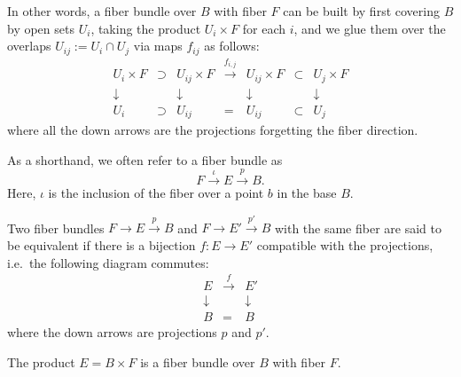 \documentclass[12pt]{article}
\numberwithin{equation}{section}
\begin{document}
In other words, a fiber bundle over $B$ with fiber $F$
can be built by first covering $B$ by open sets $U_i$,
taking the product $U_i \times F$ for each $i$,
and we glue them over the overlaps $U_{ij}:=U_i\cap U_j$ via
maps $f_{ij}$ as follows:
\begin{equation}
  \begin{array}{cccccccc}
    U_i \times F &\supset& U_{ij}\times F & \xrightarrow{f_{i,j}} & 
    U_{ij}\times F & \subset & U_j\times F \\
    \downarrow & & \downarrow & & \downarrow & & \downarrow \\
    U_i & \supset & U_{ij} & = & U_{ij} & \subset & U_j
  \end{array}
\end{equation}
where all the down arrows are the projections forgetting the fiber direction.

\begin{notation}
  As a shorthand, we often refer to a fiber bundle as 
  \begin{equation}
  F\stackrel{\iota}{\longrightarrow} E\stackrel{p}{\longrightarrow} B.  
  \end{equation}  
  Here, $\iota$ is the inclusion of the fiber over a point $b$ in the base $B$.
\end{notation}

\begin{definition}
  \label{def:bundle-equiv}
Two fiber bundles $F\to E\xrightarrow{p} B$ and $F\to E'\xrightarrow{p'} B$ with the same fiber
are said to be equivalent if there is a bijection $f: E\to E'$ 
compatible with the projections, i.e.~the following diagram commutes:
\begin{equation}
  \begin{array}{ccc}
    E & \xrightarrow{f} & E' \\
    \downarrow & & \downarrow \\
    B & = & B
  \end{array}
\end{equation}
where the down arrows are projections $p$ and $p'$.
\end{definition}

\begin{example}
  The product $E = B\times F$ is a fiber bundle over $B$ with fiber $F$.
\end{example}
\end{document}
